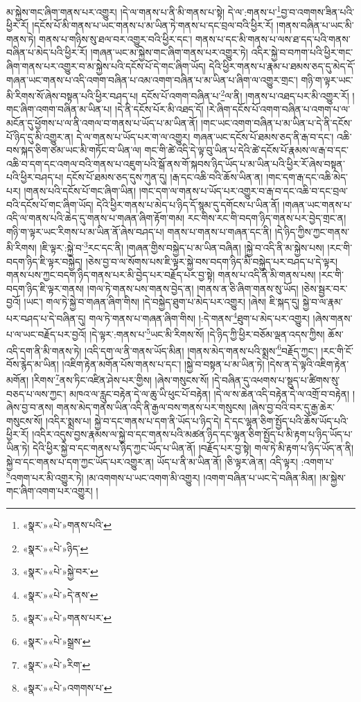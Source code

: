 མ་སྐྱེས་གང་ཞིག་གནས་པར་འགྱུར། །དེ་ལ་གནས་པ་ནི་མི་གནས་པ་སྟེ། དེ་ལ་:གནས་པ་\footnote{«སྣར་»«པེ་»གནས་པའི་}བྱ་བ་འགགས་ཟིན་པའི་ཕྱིར་རོ། །དངོས་པོ་མི་གནས་པ་ཡང་གནས་པ་མ་ཡིན་ཏེ་གནས་པ་དང་བྲལ་བའི་ཕྱིར་རོ། །གནས་བཞིན་པ་ཡང་མི་གནས་ཏེ། གནས་པ་གཉིས་སུ་ཐལ་བར་འགྱུར་བའི་ཕྱིར་དང་། གནས་པ་དང་མི་གནས་པ་ལས་ཐ་དད་པའི་གནས་བཞིན་པ་མེད་པའི་ཕྱིར་རོ། །གཞན་ཡང་མ་སྐྱེས་གང་ཞིག་གནས་པར་འགྱུར་ཏེ། འདིར་སྐྱེ་བ་བཀག་པའི་ཕྱིར་གང་ཞིག་གནས་པར་འགྱུར་བ་མ་སྐྱེས་པའི་དངོས་པོ་དེ་གང་ཞིག་ཡོད། དེའི་ཕྱིར་གནས་པ་རྣམ་པ་ཐམས་ཅད་དུ་མེད་དོ་གཞན་ཡང་གནས་པ་འདི་འགག་བཞིན་པ་འམ་འགག་བཞིན་པ་མ་ཡིན་པ་ཞིག་ལ་འགྱུར་གྲང་། གཉི་ག་ལྟར་ཡང་མི་རིགས་སོ་ཞེས་བསྟན་པའི་ཕྱིར་བཤད་པ། དངོས་པོ་འགག་བཞིན་པ་\footnote{«སྣར་»«པེ་»ཉིད་}ལ་ནི། །གནས་པ་འཐད་པར་མི་འགྱུར་རོ། །གང་ཞིག་འགག་བཞིན་མ་ཡིན་པ། །དེ་ནི་དངོས་པོར་མི་འཐད་དོ། །རེ་ཞིག་དངོས་པོ་འགག་བཞིན་པ་འགག་པ་ལ་མངོན་དུ་ཕྱོགས་པ་ལ་ནི་འགལ་བ་གནས་པ་ཡོད་པ་མ་ཡིན་ནོ། །གང་ཡང་འགག་བཞིན་པ་མ་ཡིན་པ་དེ་ནི་དངོས་པོ་ཉིད་དུ་མི་འགྱུར་ན། དེ་ལ་གནས་པ་ཡོད་པར་ག་ལ་འགྱུར། གཞན་ཡང་དངོས་པོ་ཐམས་ཅད་ནི་རྒ་བ་དང་། འཆི་བས་སྐད་ཅིག་ཙམ་ཡང་མི་གཏོང་བ་ཡིན་ལ། གང་གི་ཚེ་འདི་དེ་ལྟ་བུ་ཡིན་པ་དེའི་ཚེ་དངོས་པོ་རྣམས་ལ་རྒ་བ་དང་འཆི་བ་དག་དང་འགལ་བའི་གནས་པ་འཇུག་པའི་སྒོ་ནས་གོ་སྐབས་ཉིད་ཡོད་པ་མ་ཡིན་པའི་ཕྱིར་རོ་ཞེས་བསྟན་པའི་ཕྱིར་བཤད་པ། དངོས་པོ་ཐམས་ཅད་དུས་ཀུན་དུ། །རྒ་དང་འཆི་བའི་ཆོས་ཡིན་ན། །གང་དག་རྒ་དང་འཆི་མེད་པར། །གནས་པའི་དངོས་པོ་གང་ཞིག་ཡིན། །གང་དག་ལ་གནས་པ་ཡོད་པར་འགྱུར་བ་རྒ་བ་དང་འཆི་བ་དང་བྲལ་བའི་དངོས་པོ་གང་ཞིག་ཡོད། དེའི་ཕྱིར་གནས་པ་མེད་པ་ཉིད་དོ་སྙམ་དུ་དགོངས་པ་ཡིན་ནོ། །གཞན་ཡང་གནས་པ་འདི་ལ་གནས་པའི་ཆེད་དུ་གནས་པ་གཞན་ཞིག་རྟོག་གམ། རང་གིས་རང་གི་བདག་ཉིད་གནས་པར་བྱེད་གྲང་ན། གཉི་ག་ལྟར་ཡང་རིགས་པ་མ་ཡིན་ནོ་ཞེས་བཤད་པ། གནས་པ་གནས་པ་གཞན་དང་ནི། །དེ་ཉིད་ཀྱིས་ཀྱང་གནས་མི་རིགས། །ཇི་ལྟར་:སྐྱེ་བ་\footnote{«སྣར་»«པེ་»སྐྱེ་བར་}རང་དང་ནི། །གཞན་གྱིས་བསྐྱེད་པ་མ་ཡིན་བཞིན། །སྐྱེ་བ་འདི་ནི་མ་སྐྱེས་པས། །རང་གི་བདག་ཉིད་ཇི་ལྟར་བསྐྱེད། །ཅེས་བྱ་བ་ལ་སོགས་པས་ཇི་ལྟར་སྐྱེ་བས་བདག་ཉིད་མི་བསྐྱེད་པར་བཤད་པ་དེ་ལྟར། གནས་པས་ཀྱང་བདག་ཉིད་གནས་པར་མི་བྱེད་པར་བརྗོད་པར་བྱ་སྟེ། གནས་པ་འདི་ནི་མི་གནས་པས། །རང་གི་བདག་ཉིད་ཇི་ལྟར་གནས། །གལ་ཏེ་གནས་པས་གནས་བྱེད་ན། །གནས་ན་ཅི་ཞིག་གནས་སུ་ཡོད། །ཅེས་སྦྱར་བར་བྱའོ། །ཡང་། གལ་ཏེ་སྐྱེ་བ་གཞན་ཞིག་གིས། །དེ་བསྐྱེད་ཐུག་པ་མེད་པར་འགྱུར། །ཞེས། ཇི་སྐད་དུ། སྐྱེ་བ་ལ་རྣམ་པར་བཤད་པ་དེ་བཞིན་དུ། གལ་ཏེ་གནས་པ་གཞན་ཞིག་གིས། །:དེ་གནས་\footnote{«སྣར་»«པེ་»དེ་ནས་}ཐུག་པ་མེད་པར་འགྱུར། །ཞེས་གནས་པ་ལ་ཡང་བརྗོད་པར་བྱའོ། །དེ་ལྟར་:གནས་པ་\footnote{«སྣར་»«པེ་»གནས་པར་}ཡང་མི་རིགས་སོ། །དེ་ཉིད་ཀྱི་ཕྱིར་བཅོམ་ལྡན་འདས་ཀྱིས། ཆོས་འདི་དག་ནི་མི་གནས་ཏེ། །འདི་དག་ལ་ནི་གནས་ཡོད་མིན། །གནས་མེད་གནས་པའི་སྨྲས་\footnote{«སྣར་»«པེ་»སྒྲས་}བརྗོད་ཀྱང་། །རང་གི་ངོ་བོས་རྙེད་མ་ཡིན། །འཇིག་རྟེན་མགོན་པོས་གནས་པ་དང་། །སྐྱེ་བ་བསྟན་པ་མ་ཡིན་ཏེ། །དེས་ན་དེ་ལྟའི་འཇིག་རྟེན་མགོན། །རིགས་\footnote{«སྣར་»«པེ་»རིག་}ནས་ཏིང་འཛིན་ཤེས་པར་གྱིས། །ཞེས་གསུངས་སོ། །དེ་བཞིན་དུ་འཕགས་པ་སྡུད་པ་ཚིགས་སུ་བཅད་པ་ལས་ཀྱང་། མཁའ་ལ་རླུང་བརྟེན་དེ་ལ་ཆུ་ཡི་ཕུང་པོ་བརྟེན། །དེ་ལ་ས་ཆེན་འདི་བརྟེན་དེ་ལ་འགྲོ་བ་བརྟེན། །ཞེས་བྱ་བ་ནས། གནས་མེད་གནས་ཡིན་འདི་ནི་རྒྱལ་བས་གནས་པར་གསུངས། །ཞེས་བྱ་བའི་བར་དུ་རྒྱ་ཆེར་གསུངས་སོ། །འདིར་སྨྲས་པ། སྐྱེ་བ་དང་གནས་པ་དག་ནི་ཡོད་པ་ཉིད་དེ། དེ་དང་ལྷན་ཅིག་སྤྱོད་པའི་ཆོས་ཡོད་པའི་ཕྱིར་རོ། །འདིར་འདུས་བྱས་རྣམས་ལ་སྐྱེ་བ་དང་གནས་པའི་མཚན་ཉིད་དང་ལྷན་ཅིག་སྤྱོད་པ་མི་རྟག་པ་ཉིད་ཡོད་པ་ཡིན་ཏེ། དེའི་ཕྱིར་སྐྱེ་བ་དང་གནས་པ་ཉིད་ཀྱང་ཡོད་པ་ཡིན་ནོ། །བརྗོད་པར་བྱ་སྟེ། གལ་ཏེ་མི་རྟག་པ་ཉིད་ཡོད་ན་ནི། སྐྱེ་བ་དང་གནས་པ་དག་ཀྱང་ཡོད་པར་འགྱུར་ན། ཡོད་པ་ནི་མ་ཡིན་ནོ། །ཅི་ལྟར་ཞེ་ན། འདི་ལྟར། :འགག་པ་\footnote{«སྣར་»«པེ་»འགགས་པ་}འགག་པར་མི་འགྱུར་ཏེ། །མ་འགགས་པ་ཡང་འགག་མི་འགྱུར། །འགག་བཞིན་པ་ཡང་དེ་བཞིན་མིན། །མ་སྐྱེས་གང་ཞིག་འགག་པར་འགྱུར། །
